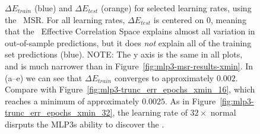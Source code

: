 \begin{figure}[t]
{        \label{fig:mlp3-trunc_err_epochs_detX_16}
    }
    \caption{
        $\Delta E_{train}$ (blue) and $\Delta E_{test}$ (orange) for selected learning rates, using the \TRACELOG~MSR. 
        For all learning rates, $\Delta E_{test}$ is centered on $0$, meaning that the \TRACELOG~Effective Correlation 
        Space explains almost all variation in out-of-sample predictions, but it does \emph{not} explain all of the 
        training set predictions (blue). NOTE: The y axis is the same in all plots, and is much narrower than in 
        Figure~\ref{fig:mlp3-msr-results-xmin}. In (a--e) we can see that $\Delta E_{train}$ converges to approximately 
        $0.002$. Compare with Figure~\ref{fig:mlp3-trunc_err_epochs_xmin_16}, which reaches a minimum of approximately 
        $0.0025$. As in Figure~\ref{fig:mlp3-trunc_err_epochs_xmin_32}, the learning rate of $32\times$ normal disrputs the 
        MLP3s ability to discover the \TRACELOG \EffectiveCorrelationSpace.
    }
    \label{fig:mlp3-msr-results-detX}
\end{figure}


